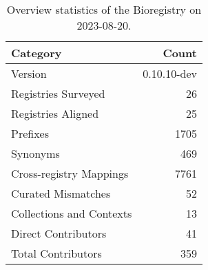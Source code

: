 \begin{table}
\caption{Overview statistics of the Bioregistry on 2023-08-20.}
\label{tab:bioregistry-summary}
\begin{tabular}{lr}
\toprule
Category & Count \\
\midrule
Version & 0.10.10-dev \\
Registries Surveyed & 26 \\
Registries Aligned & 25 \\
Prefixes & 1705 \\
Synonyms & 469 \\
Cross-registry Mappings & 7761 \\
Curated Mismatches & 52 \\
Collections and Contexts & 13 \\
Direct Contributors & 41 \\
Total Contributors & 359 \\
\bottomrule
\end{tabular}
\end{table}
